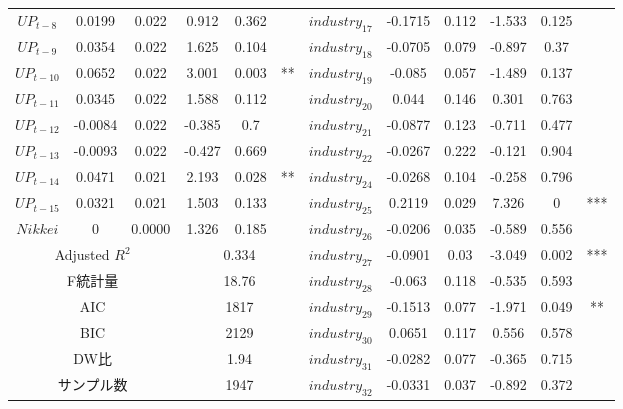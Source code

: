 \documentclass{jsarticle}
\begin{document}
\begin{table}[h]
\begin{center}
\begin{tabular}{|c|ccccc|c|ccccc|}
$UP_{t-8}$ & 0.0199 & 0.022 & 0.912 & 0.362 &  & $industry_{17}$ & -0.1715 & 0.112 & -1.533 & 0.125 &  \\
$UP_{t-9}$ & 0.0354 & 0.022 & 1.625 & 0.104 &  & $industry_{18}$ & -0.0705 & 0.079 & -0.897 & 0.37 &  \\
$UP_{t-10}$ & 0.0652 & 0.022 & 3.001 & 0.003 & ** & $industry_{19}$ & -0.085 & 0.057 & -1.489 & 0.137 &  \\
$UP_{t-11}$ & 0.0345 & 0.022 & 1.588 & 0.112 &  & $industry_{20}$ & 0.044 & 0.146 & 0.301 & 0.763 &  \\
$UP_{t-12}$ & -0.0084 & 0.022 & -0.385 & 0.7 &  & $industry_{21}$ & -0.0877 & 0.123 & -0.711 & 0.477 &  \\
$UP_{t-13}$ & -0.0093 & 0.022 & -0.427 & 0.669 &  & $industry_{22}$ & -0.0267 & 0.222 & -0.121 & 0.904 &  \\
$UP_{t-14}$ & 0.0471 & 0.021 & 2.193 & 0.028 & ** & $industry_{24}$ & -0.0268 & 0.104 & -0.258 & 0.796 &  \\
$UP_{t-15}$ & 0.0321 & 0.021 & 1.503 & 0.133 &  & $industry_{25}$ & 0.2119 & 0.029 & 7.326 & 0 & *** \\
$Nikkei$ & 0 & 0.0000 & 1.326 & 0.185 &  & $industry_{26}$ & -0.0206 & 0.035 & -0.589 & 0.556 &  \\
\cline{1-6}
\multicolumn{3}{|c|}{Adjusted $R^2$} &\multicolumn{3}{|c|}{0.334} & $industry_{27}$ & -0.0901 & 0.03 & -3.049 & 0.002 & *** \\
\multicolumn{3}{|c|}{F統計量} &\multicolumn{3}{|c|}{18.76} & $industry_{28}$ & -0.063 & 0.118 & -0.535 & 0.593 &  \\
\multicolumn{3}{|c|}{AIC} &\multicolumn{3}{|c|}{1817}& $industry_{29}$ & -0.1513 & 0.077 & -1.971 & 0.049 & ** \\
\multicolumn{3}{|c|}{BIC} &\multicolumn{3}{|c|}{2129} &$industry_{30}$ & 0.0651 & 0.117 & 0.556 & 0.578 &  \\
\multicolumn{3}{|c|}{DW比} &\multicolumn{3}{|c|}{1.94} & $industry_{31}$ & -0.0282 & 0.077 & -0.365 & 0.715 &  \\
\multicolumn{3}{|c|}{サンプル数} &\multicolumn{3}{|c|}{ 1947} & $industry_{32}$ & -0.0331 & 0.037 & -0.892 & 0.372 &  \\
\hline
	\end{tabular}
  \end{center}
\end{table}
\newpage
\end{document}
